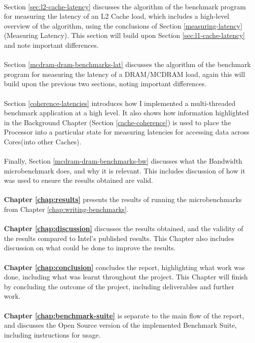\documentclass[bsc,frontabs,twoside,singlespacing,parskip,deptreport]{infthesis}     %
\begin{document}
\\
Section \ref{sec:l2-cache-latency} discusses the algorithm of the benchmark program for measuring the latency of an L2 Cache load, which includes a high-level overview of the algorithm, using the conclusions of Section \ref{measuring-latency}(Measuring Latency). This section will build upon Section \ref{sec:l1-cache-latency} and note important differences. \\
\\
Section \ref{mcdram-dram-benchmarks-lat} discusses the algorithm of the benchmark program for measuring the latency of a DRAM/MCDRAM load, again this will build upon the previous two sections, noting important differences. \\
\\
Section \ref{coherence-latencies} introduces how I implemented a multi-threaded benchmark application at a high level. It also shows how information highlighted in the Background Chapter (Section \ref{cache-coherence}) is used to place the Processor into a particular state for measuring latencies for accessing data across Cores(into other Caches). \\
\\
Finally, Section \ref{mcdram-dram-benchmarks-bw} discusses what the Bandwidth microbenchmark does, and why it is relevant. This includes discussion of how it was used to ensure the results obtained are valid. \\
\\
\textbf{Chapter \ref{chap:results}} presents the results of running the microbenchmarks from Chapter \ref{chap:writing-benchmarks}. \\
\\
\textbf{Chapter \ref{chap:discussion}} discusses the results obtained, and the validity of the results compared to Intel's published results. This Chapter also includes discussion on what could be done to improve the results. \\
\\
\textbf{Chapter \ref{chap:conclusion}} concludes the report, highlighting what work was done, including what was learnt throughout the project. This Chapter will finish by concluding the outcome of the project, including deliverables and further work. \\
\\
\textbf{Chapter \ref{chap:benchmark-suite}} is separate to the main flow of the report, and discusses the Open Source version of the implemented Benchmark Suite, including instructions for usage.
\end{document}
